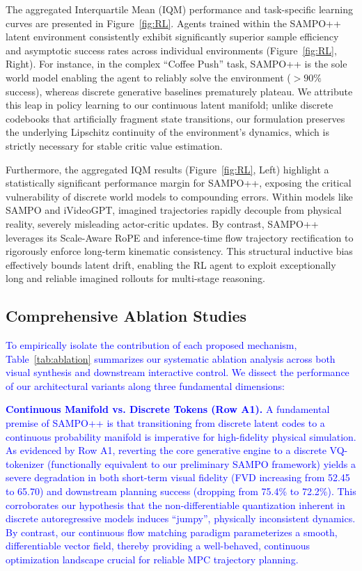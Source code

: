 The aggregated Interquartile Mean (IQM) performance and task-specific learning curves are presented in Figure~\ref{fig:RL}. Agents trained within the SAMPO++ latent environment consistently exhibit significantly superior sample efficiency and asymptotic success rates across individual environments (Figure~\ref{fig:RL}, Right). For instance, in the complex ``Coffee Push'' task, SAMPO++ is the sole world model enabling the agent to reliably solve the environment ($>90\%$ success), whereas discrete generative baselines prematurely plateau. We attribute this leap in policy learning to our continuous latent manifold; unlike discrete codebooks that artificially fragment state transitions, our formulation preserves the underlying Lipschitz continuity of the environment's dynamics, which is strictly necessary for stable critic value estimation.

Furthermore, the aggregated IQM results (Figure~\ref{fig:RL}, Left) highlight a statistically significant performance margin for SAMPO++, exposing the critical vulnerability of discrete world models to compounding errors. Within models like SAMPO and iVideoGPT, imagined trajectories rapidly decouple from physical reality, severely misleading actor-critic updates. By contrast, SAMPO++ leverages its Scale-Aware RoPE and inference-time flow trajectory rectification to rigorously enforce long-term kinematic consistency. This structural inductive bias effectively bounds latent drift, enabling the RL agent to exploit exceptionally long and reliable imagined rollouts for multi-stage reasoning.



\subsection{Comprehensive Ablation Studies}

\textcolor{blue}{To empirically isolate the contribution of each proposed mechanism, Table~\ref{tab:ablation} summarizes our systematic ablation analysis across both visual synthesis and downstream interactive control. We dissect the performance of our architectural variants along three fundamental dimensions:}

\textcolor{blue}{\textbf{Continuous Manifold vs. Discrete Tokens (Row A1).} A fundamental premise of SAMPO++ is that transitioning from discrete latent codes to a continuous probability manifold is imperative for high-fidelity physical simulation. As evidenced by Row A1, reverting the core generative engine to a discrete VQ-tokenizer (functionally equivalent to our preliminary SAMPO framework) yields a severe degradation in both short-term visual fidelity (FVD increasing from 52.45 to 65.70) and downstream planning success (dropping from 75.4\% to 72.2\%). This corroborates our hypothesis that the non-differentiable quantization inherent in discrete autoregressive models induces ``jumpy'', physically inconsistent dynamics. By contrast, our continuous flow matching paradigm parameterizes a smooth, differentiable vector field, thereby providing a well-behaved, continuous optimization landscape crucial for reliable MPC trajectory planning.} 

